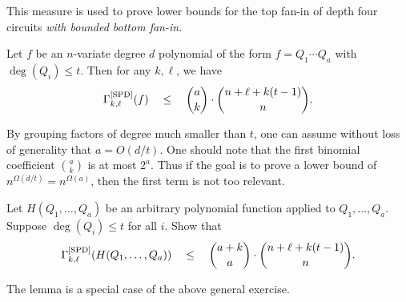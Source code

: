 
This measure is used to prove lower bounds for the top fan-in of depth four circuits \emph{with bounded bottom fan-in}. 

\begin{lemma*}
Let $f$ be an $n$-variate degree $d$ polynomial of the form $f = Q_1 \cdots Q_a$ with $\deg(Q_i) \leq t$. Then for any $k,\ell$, we have
\[
\Gamma^{\mathrm{[SPD]}}_{k,\ell}(f) \quad \leq \quad \binom{a}{k} \cdot \binom{n + \ell + k(t-1)}{n}.
\]
\end{lemma*}

By grouping factors of degree much smaller than $t$, one can assume without loss of generality that $a = O(d/t)$.
One should note that the first binomial coefficient $\binom{a}{k}$ is at most $2^a$.
Thus if the goal is to prove a lower bound of $n^{\Omega(d/t)} = n^{\Omega(a)}$, then the first term is not too relevant. \\

\begin{exercise}
Let $H(Q_1,\ldots, Q_a)$ be an arbitrary polynomial function applied to $Q_1,\ldots, Q_a$. Suppose $\deg(Q_i) \leq t$ for all $i$. Show that
\[
\Gamma^{\mathrm{[SPD]}}_{k,\ell}(H(Q_1,\ldots, Q_a)) \quad \leq \quad \binom{a+k}{a} \cdot \binom{n + \ell + k(t-1)}{n}.
\]
\end{exercise}

The lemma is a special case of the above general exercise. 

